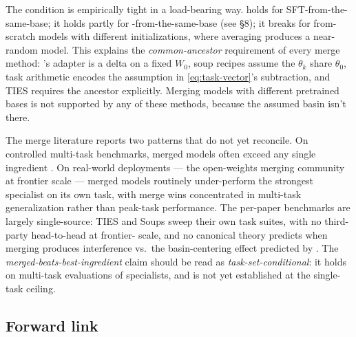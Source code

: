The condition is empirically tight in a load-bearing way.  holds for
SFT-from-the-same-base; it holds partly for -from-the-same-base
(see \S8); it breaks for from-scratch models with different
initializations, where averaging produces a near-random model. This
explains the \emph{common-ancestor} requirement of every merge method:
's adapter is a delta on a fixed $W_0$, soup recipes assume the
$\theta_k$ share $\theta_0$, task arithmetic encodes the assumption in
\cref{eq:task-vector}'s subtraction, and TIES requires the ancestor
explicitly. Merging models with different pretrained bases is not
supported by any of these methods, because the assumed basin
isn't there.

\begin{contradiction}
The merge literature reports two patterns that do not yet reconcile.
On controlled multi-task benchmarks, merged models often exceed any
single ingredient \citep[\S 4]{yadav2023-ties-merging,
wortsman2022-model-soups}. On real-world deployments — the open-weights
 merging community at frontier scale — merged models routinely
under-perform the strongest specialist on its own task, with merge wins
concentrated in multi-task generalization rather than peak-task
performance. The per-paper benchmarks are largely single-source: TIES
\citep[\S 4]{yadav2023-ties-merging} and Soups
\citep[\S 4]{wortsman2022-model-soups} sweep their own task suites, with
no third-party head-to-head at frontier- scale, and no canonical
theory predicts when merging produces interference vs.\ the
basin-centering effect predicted by . The
\emph{merged-beats-best-ingredient} claim should be read as
\emph{task-set-conditional}: it holds on multi-task evaluations of
specialists, and is not yet established at the single-task ceiling.
\end{contradiction}

\subsection{Forward link}


